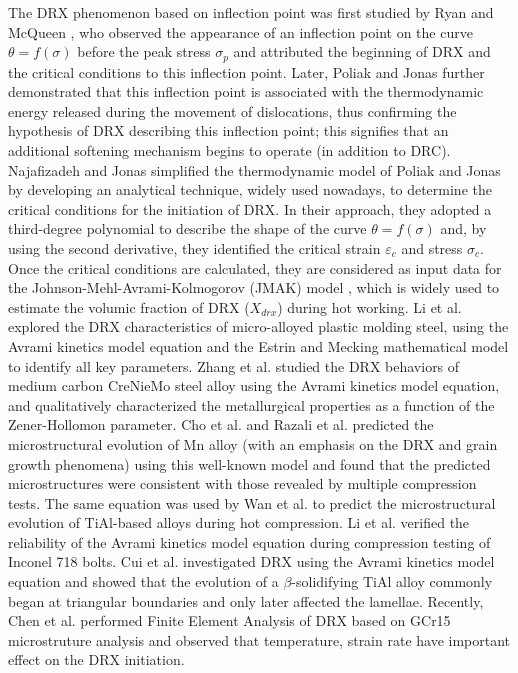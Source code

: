 \documentclass[metals,article,submit,pdftex,moreauthors]{Definitions/mdpi}
\makeatletter
\DeclareRobustCommand{\eal}{et al.\@\xspace}
\makeatother
\begin{document}
The DRX phenomenon based on inflection point was first studied by Ryan and McQueen \cite{ryan1989dynamic,ryan1990dynamic,ryan1990flow}, who observed the appearance of an inflection point on the curve $\theta=f(\sigma)$ before the peak stress $\sigma_p$ and attributed the beginning of DRX and the critical conditions to this inflection point.
Later, Poliak and Jonas \cite{Poliak-1996,ei2003initiation,ei2003critical,jonas2003critical} further demonstrated that this inflection point is associated with the thermodynamic energy released during the movement of dislocations, thus confirming the hypothesis of DRX describing this inflection point; this signifies that an additional softening mechanism begins to operate (in addition to DRC).
Najafizadeh and Jonas \cite{najafizadeh2006predicting} simplified the thermodynamic model of Poliak and Jonas by developing an analytical technique, widely used nowadays, to determine the critical conditions for the initiation of DRX.
In their approach, they adopted a third-degree polynomial to describe the shape of the curve $\theta=f(\sigma)$ and, by using the second derivative, they identified the critical strain $\varepsilon_c$ and stress $\sigma_c$.
Once the critical conditions are calculated, they are considered as input data for the Johnson-Mehl-Avrami-Kolmogorov (JMAK) model \cite{Avrami-1939}, which is widely used to estimate the volumic fraction of DRX ($X_{drx}$) during hot working.
Li \eal \cite{li2015experimental} explored the DRX characteristics of micro-alloyed plastic molding steel, using the Avrami kinetics model equation and the Estrin and Mecking mathematical model \cite{estrin1984unified,mecking1981kinetics} to identify all key parameters.
Zhang \eal \cite{zhang2016kinetics} studied the DRX behaviors of medium carbon CreNieMo steel alloy using the Avrami kinetics model equation, and qualitatively characterized the metallurgical properties as a function of the Zener-Hollomon parameter.
Cho \eal \cite{cho2005prediction} and Razali \eal \cite{razali2021new} predicted the microstructural evolution of Mn alloy (with an emphasis on the DRX and grain growth phenomena) using this well-known model and found that the predicted microstructures were consistent with those revealed by multiple compression tests.
The same equation was used by Wan \eal \cite{wan2017experimental} to predict the microstructural evolution of TiAl-based alloys during hot compression.
Li \eal \cite{li2018finite} verified the reliability of the Avrami kinetics model equation during compression testing of Inconel 718 bolts.
Cui \eal \cite{cui2016hot} investigated DRX using the Avrami kinetics model equation and showed that the evolution of a $\beta$-solidifying TiAl alloy commonly began at triangular boundaries and only later affected the lamellae.
Recently, Chen \eal \cite{chen2023finite} performed Finite Element Analysis of DRX based on GCr15 microstruture analysis and observed that temperature, strain rate have important effect on the DRX initiation.
\end{document}
